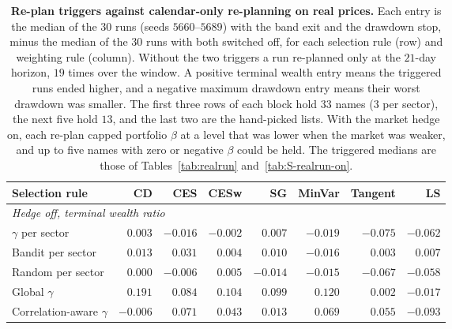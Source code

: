 \begin{table}[H]
\centering
\small
\setlength{\tabcolsep}{4pt}
\caption{\textbf{Re-plan triggers against calendar-only re-planning on real prices.} Each entry is the median of the
$30$ runs (seeds $5660$--$5689$) with the band exit and the drawdown stop, minus the median of the $30$ runs with
both switched off, for each selection rule (row) and weighting rule (column). Without the two triggers a run
re-planned only at the $21$-day horizon, $19$ times over the window. A positive terminal wealth entry means the
triggered runs ended higher, and a negative maximum drawdown entry means their worst drawdown was smaller. The
first three rows of each block hold $33$ names ($3$ per sector), the next five hold $13$, and the last two are the
hand-picked lists. With the market hedge on, each re-plan capped portfolio $\beta$ at a level that was lower when the market was weaker, and up to
five names with zero or negative $\beta$ could be held. The triggered medians are those of Tables~\ref{tab:realrun}
and~\ref{tab:S-realrun-on}.}
\label{tab:S-calendar}
\begin{tabular}{l*{7}{r}}
\toprule
Selection rule & CD & CES & CESw & SG & MinVar & Tangent & LS \\
\midrule
\multicolumn{8}{l}{\emph{Hedge off, terminal wealth ratio}} \\
$\gamma$ per sector & $0.003$ & $-0.016$ & $-0.002$ & $0.007$ & $-0.019$ & $-0.075$ & $-0.062$ \\
Bandit per sector & $0.013$ & $0.031$ & $0.004$ & $0.010$ & $-0.016$ & $0.003$ & $0.007$ \\
Random per sector & $0.000$ & $-0.006$ & $0.005$ & $-0.014$ & $-0.015$ & $-0.067$ & $-0.058$ \\
\addlinespace[2pt]
Global $\gamma$ & $0.191$ & $0.084$ & $0.104$ & $0.099$ & $0.120$ & $0.002$ & $-0.017$ \\
Correlation-aware $\gamma$ & $-0.006$ & $0.071$ & $0.043$ & $0.013$ & $0.069$ & $0.055$ & $-0.093$ \\

\end{tabular}
\end{table}
